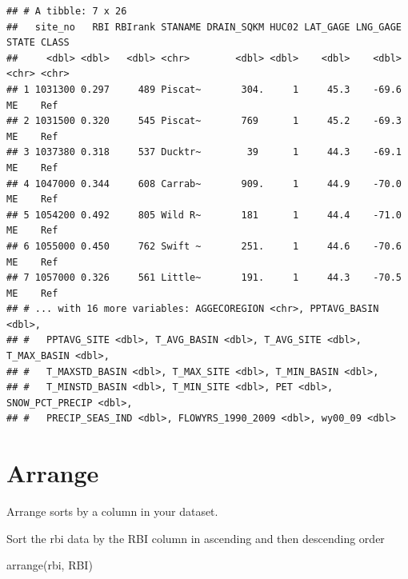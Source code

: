 \documentclass[
]{book}
\newenvironment{Shaded}{\begin{snugshade}}{\end{snugshade}}
\newcommand{\FunctionTok}[1]{\textcolor[rgb]{0.00,0.00,0.00}{#1}}
\newcommand{\NormalTok}[1]{#1}
\begin{document}
\begin{verbatim}
## # A tibble: 7 x 26
##   site_no   RBI RBIrank STANAME DRAIN_SQKM HUC02 LAT_GAGE LNG_GAGE STATE CLASS
##     <dbl> <dbl>   <dbl> <chr>        <dbl> <dbl>    <dbl>    <dbl> <chr> <chr>
## 1 1031300 0.297     489 Piscat~       304.     1     45.3    -69.6 ME    Ref  
## 2 1031500 0.320     545 Piscat~       769      1     45.2    -69.3 ME    Ref  
## 3 1037380 0.318     537 Ducktr~        39      1     44.3    -69.1 ME    Ref  
## 4 1047000 0.344     608 Carrab~       909.     1     44.9    -70.0 ME    Ref  
## 5 1054200 0.492     805 Wild R~       181      1     44.4    -71.0 ME    Ref  
## 6 1055000 0.450     762 Swift ~       251.     1     44.6    -70.6 ME    Ref  
## 7 1057000 0.326     561 Little~       191.     1     44.3    -70.5 ME    Ref  
## # ... with 16 more variables: AGGECOREGION <chr>, PPTAVG_BASIN <dbl>,
## #   PPTAVG_SITE <dbl>, T_AVG_BASIN <dbl>, T_AVG_SITE <dbl>, T_MAX_BASIN <dbl>,
## #   T_MAXSTD_BASIN <dbl>, T_MAX_SITE <dbl>, T_MIN_BASIN <dbl>,
## #   T_MINSTD_BASIN <dbl>, T_MIN_SITE <dbl>, PET <dbl>, SNOW_PCT_PRECIP <dbl>,
## #   PRECIP_SEAS_IND <dbl>, FLOWYRS_1990_2009 <dbl>, wy00_09 <dbl>
\end{verbatim}

\hypertarget{arrange}{%
\section{Arrange}\label{arrange}}

Arrange sorts by a column in your dataset.

Sort the rbi data by the RBI column in ascending and then descending order

\begin{Shaded}
\begin{Highlighting}[]
\FunctionTok{arrange}\NormalTok{(rbi, RBI)}
\end{Highlighting}
\end{Shaded}
\end{document}
